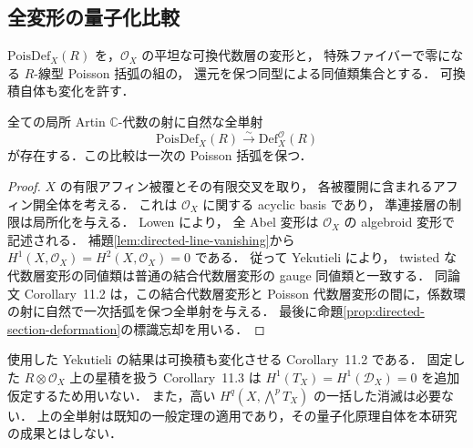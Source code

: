 \subsection{全変形の量子化比較}

$\mathrm{PoisDef}_X(R)$ を，$\mathcal O_X$ の平坦な可換代数層の変形と，
特殊ファイバーで零になる $R$-線型 Poisson 括弧の組の，
還元を保つ同型による同値類集合とする．
可換積自体も変化を許す．

\begin{proposition}[既知の量子化比較の適用]
\label{prop:abel-poisson-formal-comparison}
全ての局所 Artin $\mathbb C$-代数の射に自然な全単射
\[
 \mathrm{PoisDef}_X(R)\xrightarrow{\sim}
 \mathrm{Def}^{\mathcal O}_X(R)
\]
が存在する．この比較は一次の Poisson 括弧を保つ．
\end{proposition}
\begin{proof}
$X$ の有限アフィン被覆とその有限交叉を取り，
各被覆開に含まれるアフィン開全体を考える．
これは $\mathcal O_X$ に関する acyclic basis であり，
準連接層の制限は局所化を与える．
Lowen \cite[Theorems~3.14,3.26]{Lowen2008} により，
全 Abel 変形は $\mathcal O_X$ の algebroid 変形で記述される．
補題\ref{lem:directed-line-vanishing}から
$H^1(X,\mathcal O_X)=H^2(X,\mathcal O_X)=0$ である．
従って Yekutieli \cite[Corollary~7.5]{Yekutieli2015} により，
twisted な代数層変形の同値類は普通の結合代数層変形の gauge 同値類と一致する．
同論文 Corollary~11.2 は，この結合代数層変形と
Poisson 代数層変形の間に，係数環の射に自然で一次括弧を保つ全単射を与える．
最後に命題\ref{prop:directed-section-deformation}の標識忘却を用いる．
\end{proof}

\begin{remark}[比較定理の適用範囲]
使用した Yekutieli の結果は可換積も変化させる Corollary~11.2 である．
固定した $R\otimes\mathcal O_X$ 上の星積を扱う Corollary~11.3 は
$H^1(T_X)=H^1(\mathcal D_X)=0$ を追加仮定するため用いない．
また，高い $H^q(X,\bigwedge^pT_X)$ の一括した消滅は必要ない．
上の全単射は既知の一般定理の適用であり，その量子化原理自体を本研究の成果とはしない．
\end{remark}

